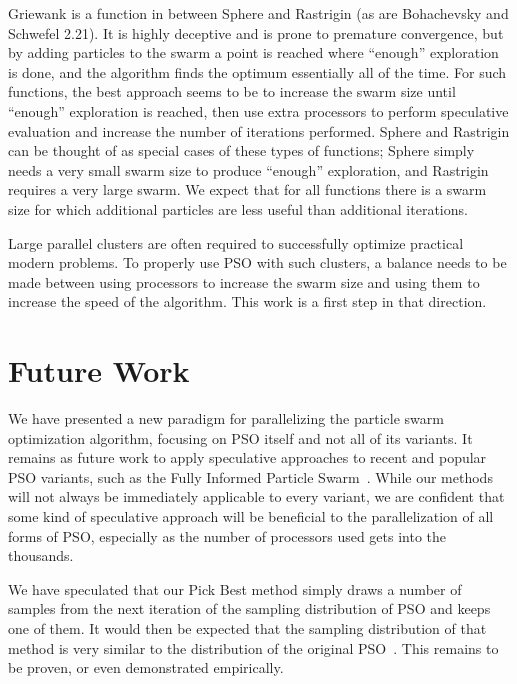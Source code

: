 \documentclass[smallcondensed]{svjour3}
\begin{document}
Griewank is a function in between Sphere and Rastrigin (as are Bohachevsky and
Schwefel 2.21).  It is highly deceptive and is prone to premature convergence,
but by adding particles to the swarm a point is reached where ``enough''
exploration is done, and the algorithm finds the optimum essentially all of the
time.  For such functions, the best approach seems to be to increase the swarm
size until ``enough'' exploration is reached, then use extra processors to
perform speculative evaluation and increase the number of iterations performed.
Sphere and Rastrigin can be thought of as special cases of these types of
functions; Sphere simply needs a very small swarm size to produce ``enough''
exploration, and Rastrigin requires a very large swarm.  We expect that for all
functions there is a swarm size for which additional particles are less useful
than additional iterations.

Large parallel clusters are often required to successfully optimize practical
modern problems.  To properly use PSO with such clusters, a balance needs to be
made between using processors to increase the swarm size and using them to
increase the speed of the algorithm.  This work is a first step in that
direction.

\section{Future Work}
\label{sec:future}

We have presented a new paradigm for parallelizing the particle swarm
optimization algorithm, focusing on PSO itself and not all of its variants.  It
remains as future work to apply speculative approaches to recent and popular
PSO variants, such as the Fully Informed Particle
Swarm~\citep{mendes-2004-fully-informed-particle-swarm}.  While our methods
will not always be immediately applicable to every variant, we are confident
that some kind of speculative approach will be beneficial to the
parallelization of all forms of PSO, especially as the number of processors
used gets into the thousands.

We have speculated that our Pick Best method simply draws a number of samples
from the next iteration of the sampling distribution of PSO and keeps one of
them.  It would then be expected that the sampling distribution of that method
is very similar to the distribution of the original
PSO~\citep{poli-2008-sampling-distribution-of-pso}.  This remains to be proven,
or even demonstrated empirically.
\end{document}
